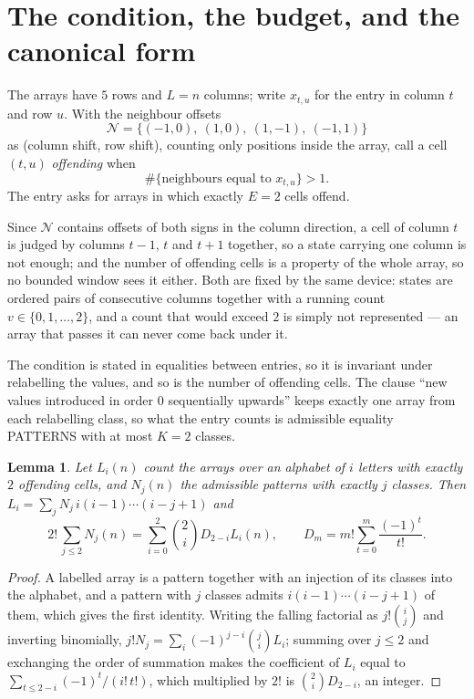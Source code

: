\documentclass[11pt,a4paper]{article}
\theoremstyle{plain}
\newtheorem{lemma}[theorem]{Lemma}
\theoremstyle{definition}
\begin{document}
\section{The condition, the budget, and the canonical form}

The arrays have $5$ rows and $L=n$ columns; write $x_{t,u}$ for the entry in
column $t$ and row $u$. With the neighbour offsets
\[
\mathcal N=\{(-1,0),\ (1,0),\ (1,-1),\ (-1,1)\}
\]
as (column shift, row shift), counting only positions inside the array, call a cell
$(t,u)$ \emph{offending} when
\[
\#\{\text{neighbours equal to }x_{t,u}\}>1 .
\]
The entry asks for arrays in which exactly $E=2$ cells offend.

Since $\mathcal N$ contains offsets of both signs in the column direction, a cell of column
$t$ is judged by columns $t-1$, $t$ and $t+1$ together, so a state carrying one column is not
enough; and the number of offending cells is a property of the whole array, so no bounded
window sees it either. Both are fixed by the same device: states are ordered pairs of
consecutive columns together with a running count $v\in\{0,1,\dots,2\}$, and a count that
would exceed $2$ is simply not represented --- an array that passes it can never come back
under it.

The condition is stated in equalities between entries, so it is invariant under relabelling
the values, and so is the number of offending cells. The clause ``new values introduced in
order $0$ sequentially upwards'' keeps exactly one array from each relabelling class, so what
the entry counts is admissible equality PATTERNS with at most $K=2$ classes.

\begin{lemma}\label{lem:inv}
Let $L_i(n)$ count the arrays over an alphabet of $i$ letters with exactly $2$ offending
cells, and $N_j(n)$ the admissible patterns with exactly $j$ classes. Then
$L_i=\sum_j N_j\,i(i-1)\cdots(i-j+1)$ and
\[
2!\,\sum_{j\le2}N_j(n)=\sum_{i=0}^{2}\binom{2}{i}D_{2-i}L_i(n),
\qquad D_m=m!\sum_{t=0}^{m}\frac{(-1)^t}{t!} .
\]
\end{lemma}

\begin{proof}
A labelled array is a pattern together with an injection of its classes into the alphabet,
and a pattern with $j$ classes admits $i(i-1)\cdots(i-j+1)$ of them, which gives the first
identity. Writing the falling factorial as $j!\binom{i}{j}$ and inverting binomially,
$j!N_j=\sum_i(-1)^{j-i}\binom{j}{i}L_i$; summing over $j\le2$ and exchanging the
order of summation makes the coefficient of $L_i$ equal to
$\sum_{t\le2-i}(-1)^t/(i!\,t!)$, which multiplied by $2!$ is
$\binom{2}{i}D_{2-i}$, an integer.
\end{proof}
\end{document}
